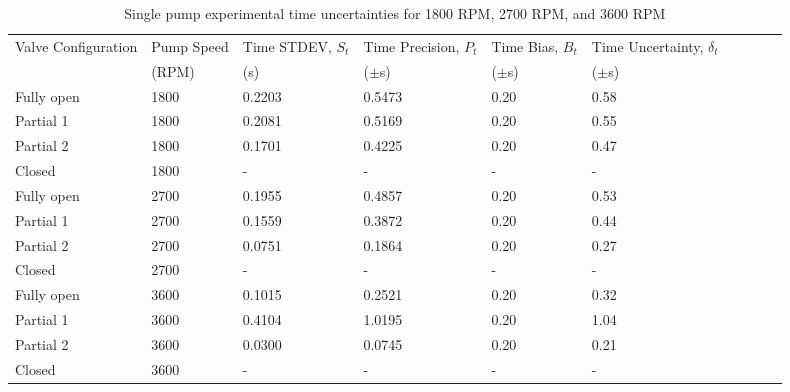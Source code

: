 \begin{table}[H]
    \centering
    \caption{Single pump experimental time uncertainties for 1800 RPM, 2700 RPM, and 3600 RPM}
    \label{tab:single_pump_time_uncertainty}
    \begin{tabular}{lC{0.15\textwidth}C{0.10\textwidth}C{0.12\textwidth}C{0.08\textwidth}C{0.10\textwidth}C{0.10\textwidth}C{0.10\textwidth}C{0.15\textwidth}C{0.10\textwidth}}
        \toprule
        Valve Configuration & Pump Speed & Time STDEV, $S_{t}$ & Time Precision, $P_t$ & Time Bias, $B_t$ & Time Uncertainty, $\delta_t$ \\
        & (RPM) & (s) & ($\pm$s) & ($\pm$s) & ($\pm$s) \\
        \midrule
        Fully open & 1800 & 0.2203 & 0.5473 & 0.20 & 0.58 \\
        Partial 1 & 1800 & 0.2081 & 0.5169 & 0.20 & 0.55 \\
        Partial 2 & 1800 & 0.1701 & 0.4225 & 0.20 & 0.47 \\
        Closed & 1800 & - & - & - & - \\
        Fully open & 2700 & 0.1955 & 0.4857 & 0.20 & 0.53 \\
        Partial 1 & 2700 & 0.1559 & 0.3872 & 0.20 & 0.44 \\
        Partial 2 & 2700 & 0.0751 & 0.1864 & 0.20 & 0.27 \\
        Closed & 2700 & - & - & - & - \\
        Fully open & 3600 & 0.1015 & 0.2521 & 0.20 & 0.32 \\
        Partial 1 & 3600 & 0.4104 & 1.0195 & 0.20 & 1.04 \\
        Partial 2 & 3600 & 0.0300 & 0.0745 & 0.20 & 0.21 \\
        Closed & 3600 & - & - & - & - \\
        \bottomrule
    \end{tabular}
\end{table}
